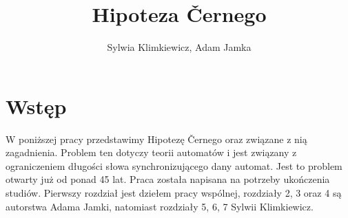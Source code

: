 \documentclass[12pt,a4paper]{article}
\begin{document}
\title{Hipoteza \v Cernego}
\author{Sylwia Klimkiewicz, Adam Jamka}
\maketitle

\section*{Wst\k{e}p}
W poni\.{z}szej pracy przedstawimy Hipotez\k{e} \v Cernego oraz zwi\k{a}zane z ni\k{a} zagadnienia. Problem ten dotyczy teorii automat\'ow i jest zwi\k{a}zany z ograniczeniem d{\l}ugo\'{s}ci s{\l}owa synchronizuj\k{a}cego dany automat. Jest to problem otwarty ju\.{z} od ponad 45 lat. Praca zosta{\l}a napisana na potrzeby uko\'{n}czenia studi\'{o}w. Pierwszy rozdzia{\l} jest dzie{\l}em pracy wsp\'{o}lnej, rozdzia{\l}y 2, 3 oraz 4 s\k{a} autorstwa Adama Jamki, natomiast rozdzia{\l}y 5, 6, 7 Sylwii Klimkiewicz.

\end{document}

